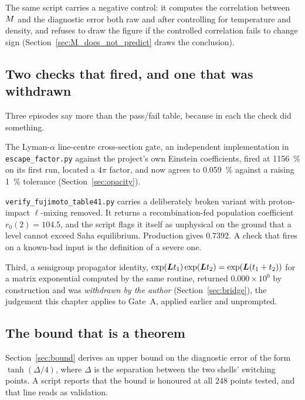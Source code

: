 The same script carries a negative control: it computes the correlation between
$M$ and the diagnostic error both raw and after controlling for temperature
and density, and refuses to draw the figure if the controlled correlation fails
to change sign (Section~\ref{sec:M_does_not_predict} draws the conclusion).

\subsection{Two checks that fired, and one that was withdrawn}

Three episodes say more than the pass/fail table, because in each the check did
something.

The Lyman-$\alpha$ line-centre cross-section gate, an independent implementation
in \texttt{escape\_factor.py} against the project's own Einstein coefficients,
fired at \SI{1156}{\percent} on its first run, located a $4\pi$ factor, and now
agrees to \SI{0.059}{\percent} against a raising \SI{1}{\percent} tolerance
(Section~\ref{sec:opacity}).

\texttt{verify\_fujimoto\_table41.py} carries a deliberately broken variant with
proton-impact $\ell$-mixing removed. It returns a recombination-fed population
coefficient $r_0(2) = 104.5$, and the script flags it itself as unphysical on
the ground that a level cannot exceed Saha equilibrium. Production gives
$0.7392$. A check that fires on a known-bad input is the definition of a severe
one.

Third, a semigroup propagator identity,
$\exp(\bm{L} t_1)\exp(\bm{L} t_2) = \exp(\bm{L}(t_1+t_2))$ for a matrix exponential
computed by the same routine, returned $0.000\times10^{0}$ by construction and
was \emph{withdrawn by the author} (Section~\ref{sec:bridge}), the judgement
this chapter applies to Gate~A, applied earlier and unprompted.

\subsection{The bound that is a theorem}

Section~\ref{sec:bound} derives an upper bound on the diagnostic error of the
form $\tanh(\Delta/4)$, where $\Delta$ is the separation between the two shells'
switching points. A script reports that the bound is honoured at all $248$
points tested, and that line reads as validation.

